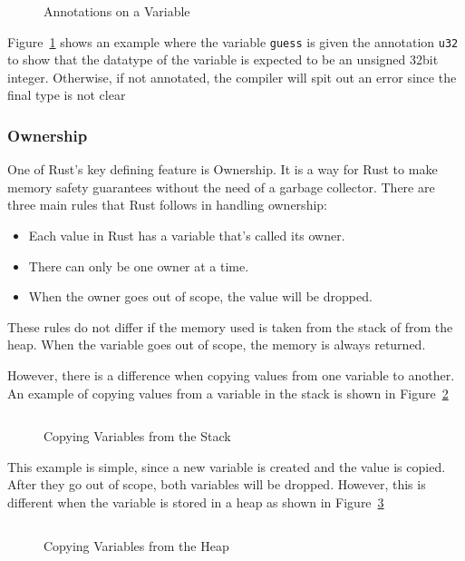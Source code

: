 \documentclass{article}
\newcommand{\rust}[1]{\inputminted{rust}{samples/rust/#1.rs}}
\newcommand{\rustin}[1]{\texttt{#1}}
\begin{document}
  \begin{figure}[ht]
    \rust{annotations}
    \caption{Annotations on a Variable}
    \label{fig:annot}
  \end{figure}

  Figure~\ref{fig:annot} shows an example where the variable \rustin{guess} is
  given the annotation \rustin{u32} to show that the datatype of the variable is
  expected to be an unsigned 32bit integer. Otherwise, if not annotated, the
  compiler will spit out an error since the final type is not clear

  \subsubsection{Ownership}
  One of Rust's key defining feature is Ownership. It is a way for Rust to make
  memory safety guarantees without the need of a garbage collector. There are
  three main rules that Rust follows in handling ownership:

  \begin{itemize}
    \item Each value in Rust has a variable that’s called its owner.
    \item There can only be one owner at a time.
    \item When the owner goes out of scope, the value will be dropped.
  \end{itemize}

  These rules do not differ if the memory used is taken from the stack of from
  the heap. When the variable goes out of scope, the memory is always returned.

  However, there is a difference when copying values from one variable to
  another. An example of copying values from a variable in the stack is shown in
  Figure~\ref{fig:copy-stack}

  \begin{figure}[ht]
    \rust{copy-stack}
    \caption{Copying Variables from the Stack}
    \label{fig:copy-stack}
  \end{figure}

  This example is simple, since a new variable is created and the value is
  copied. After they go out of scope, both variables will be dropped. However,
  this is different when the variable is stored in a heap as shown in
  Figure~\ref{fig:copy-heap}

  \begin{figure}[ht]
    \rust{copy-heap}
    \caption{Copying Variables from the Heap}
    \label{fig:copy-heap}
  \end{figure}
\end{document}
